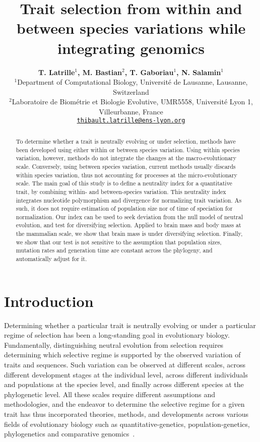 \documentclass{article}
\title{Trait selection from within and between species variations while integrating genomics}
\author{
\large
\textbf{T. {Latrille}$^{1}$\orcidlink{0000-0002-9643-4668}, M. {Bastian}$^{2}$, T. {Gaboriau}$^{1}$\orcidlink{0000-0001-7530-2204}, N. {Salamin}$^{1}$\orcidlink{0000-0002-3963-4954}}\\
\normalsize
$^{1}$Department of Computational Biology, Université de Lausanne, Lausanne, Switzerland\\
$^{2}$Laboratoire de Biométrie et Biologie Evolutive, UMR5558, Université Lyon 1, Villeurbanne, France \\
\texttt{\href{mailto:thibault.latrille@ens-lyon.org}{thibault.latrille@ens-lyon.org}} \\
}
\begin{document}
\maketitle

\begin{abstract}
    To determine whether a trait is neutrally evolving or under selection, methods have been developed using either within or between species variation.
    Using within species variation, however, methods do not integrate the changes at the macro-evolutionary scale.
    Conversely, using between species variation, current methods usually discards within species variation, thus not accounting for processes at the micro-evolutionary scale.
    The main goal of this study is to define a neutrality index for a quantitative trait, by combining within- and between-species variation.
    This neutrality index integrates nucleotide polymorphism and divergence for normalizing trait variation.
    As such, it does not require estimation of population size nor of time of speciation for normalization.
    Our index can be used to seek deviation from the null model of neutral evolution, and test for diversifying selection.
    Applied to brain mass and body mass at the mammalian scale, we show that brain mass is under diversifying selection.
    Finally, we show that our test is not sensitive to the assumption that population sizes, mutation rates and generation time are constant across the phylogeny, and automatically adjust for it.
\end{abstract}


\section*{Introduction}\label{sec:introduction}

Determining whether a particular trait is neutrally evolving or under a particular regime of selection has been a long-standing goal in evolutionary biology.
Fundamentally, distinguishing neutral evolution from selection requires determining which selective regime is supported by the observed variation of traits and sequences.
Such variation can be observed at different scales, across different development stages at the individual level, across different individuals and populations at the species level, and finally across different species at the phylogenetic level.
All these scales require different assumptions and methodologies, and the endeavor to determine the selective regime for a given trait has thus incorporated theories, methods, and developments across various fields of evolutionary biology such as quantitative-genetics, population-genetics, phylogenetics and comparative genomics~\cite{lynch_genetics_1998, walsh_evolution_2018}.
\end{document}
